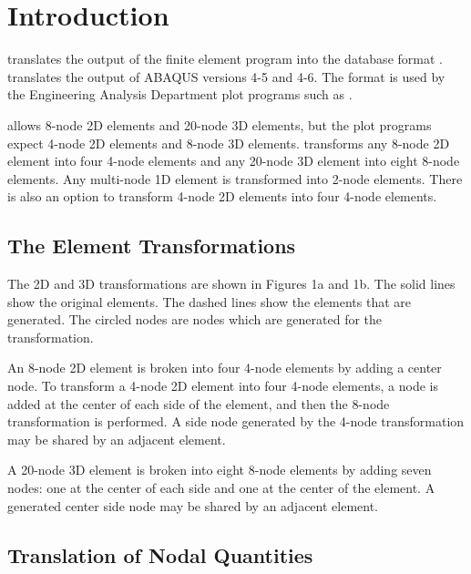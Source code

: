 \chapter{Introduction} \label{chap:intro}

\caps{\PROGRAM} translates the output of the  finite element
program \cite{bib:abaqus} into the  database format
\cite{bib:exodus}.  translates the output of ABAQUS versions
4-5 and 4-6.
The  format is used by the
Engineering Analysis Department plot programs such as 
\cite{bib:blot}.

 allows 8-node 2D elements and 20-node 3D elements, but the
plot programs expect 4-node 2D elements and 8-node 3D elements.
\caps{\PROGRAM} transforms any 8-node 2D element into four 4-node
elements and any 20-node 3D element into eight 8-node elements. Any
multi-node 1D element is transformed into 2-node elements. There is also
an option to transform 4-node 2D elements into four 4-node elements.

\section{The Element Transformations} \label{intro:trans}

The 2D and 3D transformations are shown in Figures 1a and 1b. The solid
lines show the original elements. The dashed lines show the elements
that are generated. The circled nodes are nodes which are generated for
the transformation.

An 8-node 2D element is broken into four 4-node elements by adding a
center node. To transform a 4-node 2D element into four 4-node elements,
a node is added at the center of each side of the element, and then the
8-node transformation is performed. A side node generated by the 4-node
transformation may be shared by an adjacent element.

A 20-node 3D element is broken into eight 8-node elements by adding
seven nodes: one at the center of each side and one at the center of the
element. A generated center side node may be shared by an adjacent
element.

\newpage \addtocounter{page}{1}

\newcommand{\nodenum}[1] {\em #1}

\section{Translation of Nodal Quantities} \label{intro:nodal}

